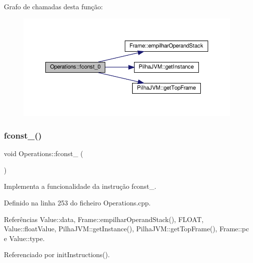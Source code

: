 Grafo de chamadas desta função\+:\nopagebreak
\begin{figure}[H]
\begin{center}
\leavevmode
\includegraphics[width=350pt]{classOperations_ad3d2d82d63e7a96e144cdf014d6fb1d9_cgraph}
\end{center}
\end{figure}
\mbox{\label{classOperations_aa2053d7f3d410a4531f5bd560b4211b4}} 
\subsubsection{\texorpdfstring{fconst\+\_()}{fconst\_1()}}
{\footnotesize\ttfamily void Operations\+::fconst\+\_ (\begin{DoxyParamCaption}{ }\end{DoxyParamCaption})\hspace{0.3cm}{\ttfamily [private]}}



Implementa a funcionalidade da instrução fconst\+\_. 



Definido na linha 253 do ficheiro Operations.\+cpp.



Referências Value\+::data, Frame\+::empilhar\+Operand\+Stack(), F\+L\+O\+AT, Value\+::float\+Value, Pilha\+J\+V\+M\+::get\+Instance(), Pilha\+J\+V\+M\+::get\+Top\+Frame(), Frame\+::pc e Value\+::type.



Referenciado por init\+Instructions().


